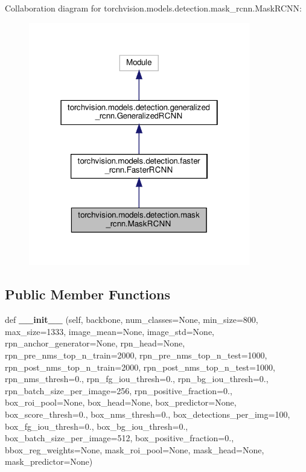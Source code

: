 Collaboration diagram for torchvision.\+models.\+detection.\+mask\+\_\+rcnn.\+Mask\+R\+C\+NN\+:
\nopagebreak
\begin{figure}[H]
\begin{center}
\leavevmode
\includegraphics[width=274pt]{classtorchvision_1_1models_1_1detection_1_1mask__rcnn_1_1MaskRCNN__coll__graph}
\end{center}
\end{figure}
\subsection*{Public Member Functions}
\begin{DoxyCompactItemize}
\item 
\mbox{\label{classtorchvision_1_1models_1_1detection_1_1mask__rcnn_1_1MaskRCNN_a17137985d50ea3cff0799da91e2c6c96}} 
def {\bfseries \+\_\+\+\_\+init\+\_\+\+\_\+} (self, backbone, num\+\_\+classes=None, min\+\_\+size=800, max\+\_\+size=1333, image\+\_\+mean=None, image\+\_\+std=None, rpn\+\_\+anchor\+\_\+generator=None, rpn\+\_\+head=None, rpn\+\_\+pre\+\_\+nms\+\_\+top\+\_\+n\+\_\+train=2000, rpn\+\_\+pre\+\_\+nms\+\_\+top\+\_\+n\+\_\+test=1000, rpn\+\_\+post\+\_\+nms\+\_\+top\+\_\+n\+\_\+train=2000, rpn\+\_\+post\+\_\+nms\+\_\+top\+\_\+n\+\_\+test=1000, rpn\+\_\+nms\+\_\+thresh=0., rpn\+\_\+fg\+\_\+iou\+\_\+thresh=0., rpn\+\_\+bg\+\_\+iou\+\_\+thresh=0., rpn\+\_\+batch\+\_\+size\+\_\+per\+\_\+image=256, rpn\+\_\+positive\+\_\+fraction=0., box\+\_\+roi\+\_\+pool=None, box\+\_\+head=None, box\+\_\+predictor=None, box\+\_\+score\+\_\+thresh=0., box\+\_\+nms\+\_\+thresh=0., box\+\_\+detections\+\_\+per\+\_\+img=100, box\+\_\+fg\+\_\+iou\+\_\+thresh=0., box\+\_\+bg\+\_\+iou\+\_\+thresh=0., box\+\_\+batch\+\_\+size\+\_\+per\+\_\+image=512, box\+\_\+positive\+\_\+fraction=0., bbox\+\_\+reg\+\_\+weights=None, mask\+\_\+roi\+\_\+pool=None, mask\+\_\+head=None, mask\+\_\+predictor=None)
\end{DoxyCompactItemize}
